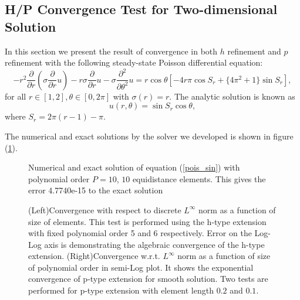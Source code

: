 
\subsection {H/P Convergence Test for Two-dimensional Solution}

In this section we present the result of convergence in both $h$ refinement and $p$ refinement with the following steady-state Poisson differential equation:
\begin{equation}
\label{pois_sin}
-r^2 \frac{\partial}{\partial r} (\sigma \frac{\partial}{\partial r}u) - r \sigma \frac{\partial}{\partial r}u - \sigma \frac{\partial^2}{\partial \theta^2}u = r \cos \theta \left[ -4 r \pi \cos S_r + \{4\pi^2 + 1\} \sin S_r \right],
\end{equation}
for all $r \in [1, 2], \theta \in [0, 2\pi]$ with $\sigma(r) = r$. The analytic solution is known as 
\begin{equation}
u(r, \theta) = \sin S_r \cos \theta,
\end{equation}
where $S_r = 2\pi (r-1) - \pi$.

The numerical and exact solutions by the solver we developed is shown in figure (\ref{sinsol}).

\begin{figure}[h]
    \begin{center}
    \caption{\label{sinsol}Numerical and exact solution of equation (\ref{pois_sin}) with polynomial order $P=10$, $10$ equidistance elements. This gives the error 4.7740e-15 to the exact solution}
    \end{center}
\end{figure}

\begin{figure}[h]
    \begin{center}
    \caption{\label{sinDNconv}
(Left)Convergence with respect to discrete $L^{\infty}$ norm as a function of size of elements. This test is performed using the h-type extension with fixed polynomial order 5 and 6 respectively. Error on the Log-Log axis is demonstrating the algebraic convergence of the h-type extension.
(Right)Convergence w.r.t. $L^{\infty}$ norm as a function of size of polynomial order in semi-Log plot. It shows the exponential convergence of p-type extension for smooth solution. Two tests are performed for p-type extension with element length $0.2$ and $0.1$.
}
\end{center}
\end{figure}


